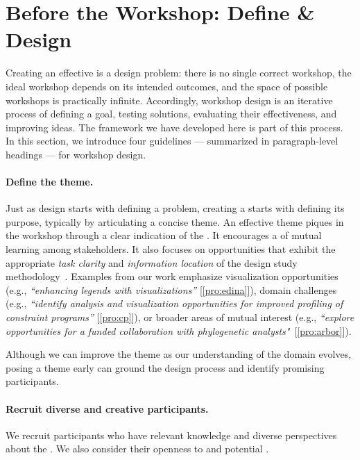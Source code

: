 \section{Before the Workshop: Define \& Design}
\label{sec:before}

Creating an effective \workshop is a design problem: there is no single correct workshop, the ideal workshop depends on its intended outcomes, and the space of possible workshops is practically infinite. Accordingly, workshop design is an iterative process of defining a goal, testing solutions, evaluating their effectiveness, and improving ideas. The framework we have developed here is part of this process. In this section, we introduce four guidelines --- summarized in paragraph-level headings --- for workshop design.

\paragraph{Define the theme.} Just as design starts with defining a problem, creating a \workshop starts with defining its purpose, typically by articulating a concise theme.
An effective theme piques \interest in the workshop through a clear indication of the \topic. It encourages a \mindset of mutual learning among stakeholders. It also focuses on opportunities that exhibit the appropriate {\it task clarity} and {\it information location} of the design study methodology~\cite{Sedlmair2012}. Examples from our work emphasize visualization opportunities (e.g., {\it ``enhancing legends with visualizations''} [\ref{pro:edina}]), domain challenges (e.g., {\it ``identify analysis and visualization opportunities for improved profiling of constraint programs''} [\ref{pro:cp}]), or broader areas of mutual interest (e.g., {\it``explore opportunities for a funded collaboration with phylogenetic analysts"}~[\ref{pro:arbor}]).

Although we can improve the theme as our understanding of the domain evolves, posing a theme early can ground the design process and identify promising participants.

\paragraph{Recruit diverse and creative participants.} \label{par:participants} We recruit participants who have relevant knowledge and diverse perspectives about the \topic. We also consider their openness to \challenge and potential \collegiality.

